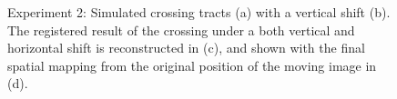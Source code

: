 \documentclass[twocolumn]{svjour3}
\begin{document}
\begin{figure}[!t]
  \hspace*{.1cm}
  \caption{Experiment 2: Simulated crossing tracts (a) with a vertical shift (b). The
    registered result of the crossing under a both vertical and horizontal shift is
    reconstructed in (c), and shown with the final spatial mapping from the original
    position of the moving image in (d).}
  \label{fig:straight2shift_x_results}
  \vspace*{-0.5cm}
\end{figure}
\end{document}
